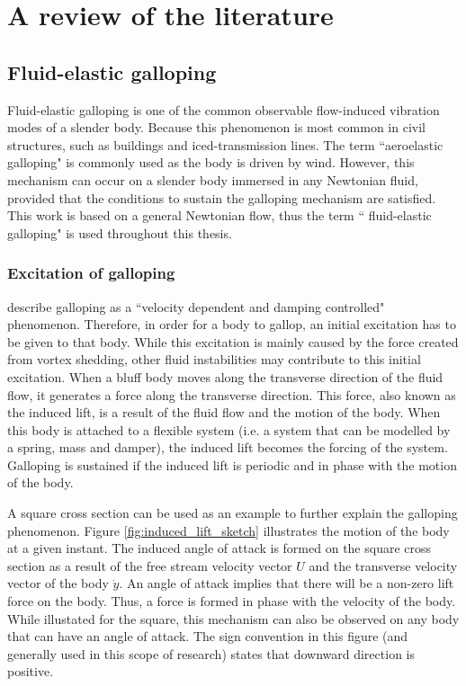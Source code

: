 \chapter{A review of the literature}
\label{chap:lit-review}

\section{Fluid-elastic galloping}
\label{fluid-elastic galloping}

Fluid-elastic galloping is one of the common observable flow-induced vibration modes of a slender body. Because this phenomenon is most common in civil structures, such as buildings and iced-transmission lines. The term ``aeroelastic galloping" is commonly used as the body is driven by wind. However, this mechanism can occur on a slender body immersed in any Newtonian fluid, provided that the conditions to sustain the galloping mechanism are satisfied. This work is based on a general Newtonian flow, thus the term `` fluid-elastic galloping" is used throughout this thesis.
   

\subsection{Excitation of galloping}
\label{sec:exci-galloping}

\citet{Paidoussis2010} describe galloping as a ``velocity dependent and damping controlled" phenomenon. Therefore, in order for a body to gallop, an initial excitation has to be given to that body. While this excitation is mainly caused by the force created from vortex shedding, other fluid instabilities may contribute to this initial excitation.  When a bluff body moves along the transverse direction of the fluid flow, it generates a force along the transverse direction. This force, also known as the induced lift, is a result of the fluid flow and the motion of the body. When this body is attached to a flexible system (i.e. a system that can be modelled by a spring, mass and damper), the induced lift becomes the forcing of the system. Galloping is sustained  if the induced lift is periodic and in phase with the motion of the body.





A square cross section can be used as an example to further explain the galloping phenomenon. Figure \ref{fig:induced_lift_sketch}  illustrates the motion of the body at a given instant. The induced angle of attack is formed on the square cross section as a result of the free stream velocity vector $U$ and the transverse velocity vector of the body $\dot{y}$. An angle of attack implies that there will be a non-zero lift force on the body. Thus, a force is formed in phase with the velocity of the body. While illustated for the square, this mechanism can also be observed on any body that can have an angle of attack. The sign convention in this figure (and generally used in this scope of research) states that downward direction is positive.  

